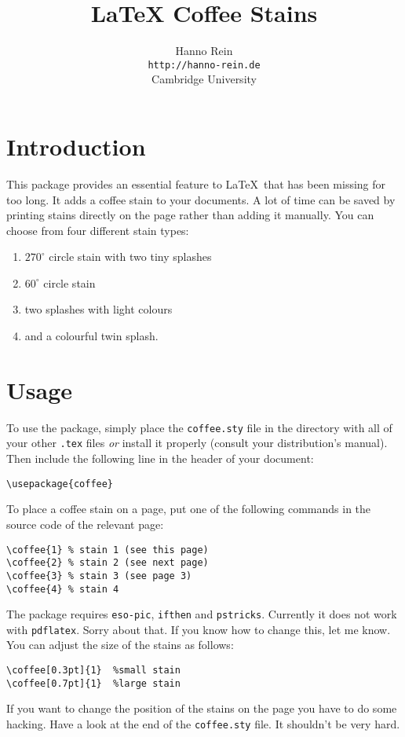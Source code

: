 \documentclass{article}
\begin{document}
\title{LaTeX Coffee Stains}
\author{Hanno Rein\\
\texttt{http://hanno-rein.de}\\
Cambridge University}
\renewcommand{\today}{April 3, 2009}
\maketitle
{}
\section{Introduction}
This package provides an essential feature to \LaTeX~that has been
missing for too long. It adds a coffee stain to your documents. A lot of
time can be saved by printing stains directly on the page rather than
adding it manually. You can choose from four different stain types:
\begin{enumerate}
  \item $270^\circ$ circle stain with two tiny splashes
  \item $60^\circ$ circle stain
  \item two splashes with light colours
  \item and a colourful twin splash.
\end{enumerate}

\section{Usage}
To use the package, simply place the \texttt{coffee.sty} file in the
directory with all of your other \texttt{.tex} files \textit{or} install
it properly (consult your distribution's manual). Then include the
following line in the header of your document:
\begin{verbatim}
\usepackage{coffee}
\end{verbatim}
To place a coffee stain on a page, put one of the following commands in
the source code of the relevant page:
\begin{verbatim}
\coffee{1} % stain 1 (see this page)
\coffee{2} % stain 2 (see next page)
\coffee{3} % stain 3 (see page 3)
\coffee{4} % stain 4
\end{verbatim}
The package requires \texttt{eso-pic}, \texttt{ifthen} and
\texttt{pstricks}. Currently it does not work with \texttt{pdflatex}.
Sorry about that. If you know how to change this, let me know.
\newpage
\noindent You can adjust the size of the stains as follows:
\begin{verbatim}
\coffee[0.3pt]{1}  %small stain
\coffee[0.7pt]{1}  %large stain
\end{verbatim}
If you want to change the position of the stains on the page you have to
do some hacking. Have a look at the end of the \texttt{coffee.sty} file.
It shouldn't be very hard.
\end{document}
